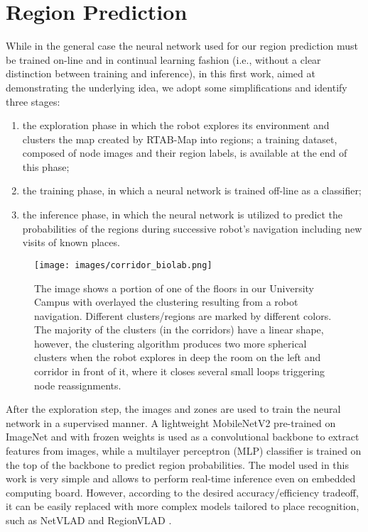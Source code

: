 \documentclass[letterpaper, 10 pt, conference]{ieeeconf}  %
\begin{document}
\section{Region Prediction} \label{prediciton}
While in the general case the neural network used for our region prediction must be trained on-line and in continual learning fashion (i.e., without a clear distinction between training and inference), in this first work, aimed at demonstrating the underlying idea, we adopt some simplifications and identify three stages: 
\begin{enumerate}
    \item the exploration phase in which the robot explores its environment and clusters the map created by RTAB-Map into regions; a training dataset, composed of node images and their region labels, is available at the end of this phase;
    \item the training phase, in which a neural network is trained off-line as a classifier;
    \item the inference phase, in which the neural network is utilized to predict the probabilities of the regions during successive robot’s navigation including new visits of known places.
\end{enumerate}

\begin{figure}[t]
    \centering
    \texttt{[image: images/corridor\_biolab.png]}
    \caption{The image shows a portion of one of the floors in our University Campus with overlayed the clustering resulting from a robot navigation. Different clusters/regions are marked by different colors. The majority of the clusters (in the corridors) have a linear shape, however, the clustering algorithm produces two more spherical clusters when the robot explores in deep the room on the left and corridor in front of it, where it closes several small loops triggering node reassignments.}
    \label{fig:biolab}

\end{figure}

After the exploration step, the images and zones are used to train the neural network in a supervised manner. A lightweight MobileNetV2 \cite{b13} pre-trained on ImageNet and with frozen weights is used as a convolutional backbone to extract features from images, while a multilayer perceptron (MLP) classifier is trained on the top of the backbone to predict region probabilities. The model used in this work is very simple and allows to perform real-time inference even on embedded computing board. However, according to the desired accuracy/efficiency tradeoff, it can be easily replaced with more complex models tailored to place recognition, such as NetVLAD \cite{b14} and RegionVLAD \cite{b15}.  
\end{document}
